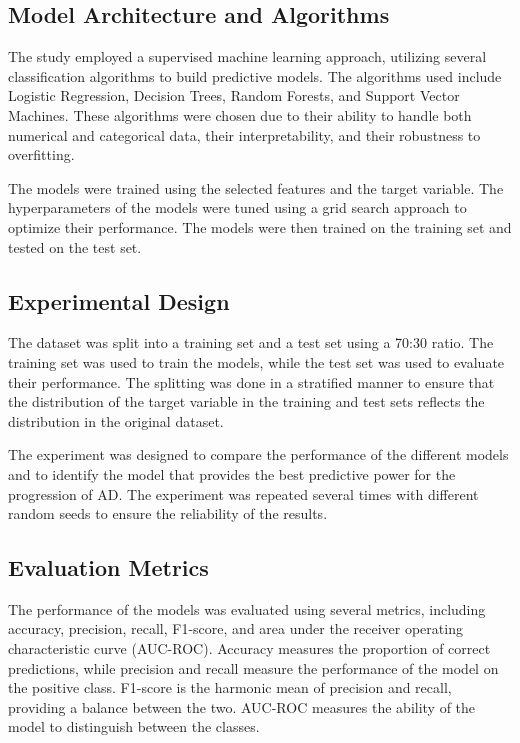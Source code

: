 \documentclass[conference]{IEEEtran}
\begin{document}
\subsection{Model Architecture and Algorithms}

The study employed a supervised machine learning approach, utilizing several classification algorithms to build predictive models. The algorithms used include Logistic Regression, Decision Trees, Random Forests, and Support Vector Machines. These algorithms were chosen due to their ability to handle both numerical and categorical data, their interpretability, and their robustness to overfitting.

The models were trained using the selected features and the target variable. The hyperparameters of the models were tuned using a grid search approach to optimize their performance. The models were then trained on the training set and tested on the test set.

\subsection{Experimental Design}

The dataset was split into a training set and a test set using a 70:30 ratio. The training set was used to train the models, while the test set was used to evaluate their performance. The splitting was done in a stratified manner to ensure that the distribution of the target variable in the training and test sets reflects the distribution in the original dataset.

The experiment was designed to compare the performance of the different models and to identify the model that provides the best predictive power for the progression of AD. The experiment was repeated several times with different random seeds to ensure the reliability of the results.

\subsection{Evaluation Metrics}

The performance of the models was evaluated using several metrics, including accuracy, precision, recall, F1-score, and area under the receiver operating characteristic curve (AUC-ROC). Accuracy measures the proportion of correct predictions, while precision and recall measure the performance of the model on the positive class. F1-score is the harmonic mean of precision and recall, providing a balance between the two. AUC-ROC measures the ability of the model to distinguish between the classes.
\end{document}
